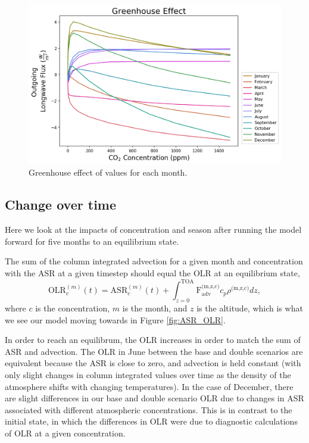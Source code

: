 \documentclass[12]{article}
\begin{document}
\begin{figure}[htb!]
\noindent\includegraphics[width=.8\textwidth]{figures/GHE.png}
\centering
\caption{Greenhouse effect of  values for each month.}
\label{fig:GHE}
\end{figure}

\subsection{Change over time}
Here we look at the impacts of  concentration and season after running the model forward for five months to an equilibrium state. 

The sum of the column integrated advection for a given month and  concentration with the ASR at a given timestep should equal the OLR at an equilibrium state,
\begin{equation}
    \text{OLR}^{(m)}_{c}(t) = \text{ASR}^{(m)}_{c}(t) +  \int_{z=0}^{\text{TOA}}{\text{F}_{\text{adv}}^{\text{(m,z,c)}} c_p \rho^{\text{(m,z,c)}} dz},
\end{equation}
where $c$ is the  concentration, $m$ is the month, and $z$ is the altitude, which is what we see our model moving towards in Figure \ref{fig:ASR_OLR}. 

In order to reach an equilibrum, the OLR increases in order to match the sum of ASR and advection. The OLR in June between the base and double  scenarios are equivalent because the ASR is close to zero, and advection is held constant (with only slight changes in column integrated values over time as the density of the atmosphere shifts with changing temperatures). In the case of December, there are slight differences in our base and double  scenario OLR due to changes in ASR associated with different atmospheric  concentrations. This is in contrast to the initial state, in which the differences in OLR were due to diagnostic calculations of OLR at a given  concentration.
\end{document}
